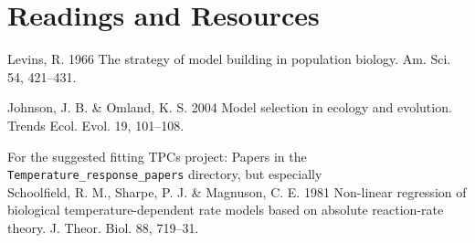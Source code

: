 \section{Readings and Resources}

\begin{compactitem} \itemsep6pt
\item Levins, R. 1966 The strategy of model building in population 
biology. Am. Sci. 54, 421--431.  

\item Johnson, J. B. \& Omland, K. S. 2004 Model selection in ecology 
and evolution. Trends Ecol. Evol. 19, 101--108. 

\item For the suggested fitting TPCs project: Papers in the {\tt 
Temperature\_response\_papers} directory, but especially \\ 
Schoolfield, R. M., Sharpe, P. J. \& Magnuson, C. E. 1981 Non-linear 
regression of biological temperature-dependent rate models based on 
absolute reaction-rate theory. J. Theor. Biol. 88, 719--31. 

\end{compactitem}
